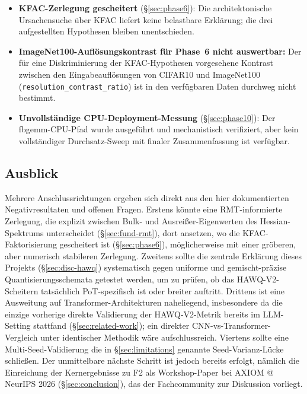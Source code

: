 \begin{itemize}
\item \textbf{KFAC-Zerlegung gescheitert} (\S\ref{sec:phase6}): Die architektonische Ursachensuche über KFAC liefert keine belastbare Erklärung; die drei aufgestellten Hypothesen bleiben unentschieden.
\item \textbf{ImageNet100-Auflösungskontrast für Phase~6 nicht auswertbar:} Der für eine Diskriminierung der KFAC-Hypothesen vorgesehene Kontrast zwischen den Eingabeauflösungen von CIFAR10 und ImageNet100 (\texttt{resolution\_contrast\_ratio}) ist in den verfügbaren Daten durchweg nicht bestimmt.
\item \textbf{Unvollständige CPU-Deployment-Messung} (\S\ref{sec:phase10}): Der fbgemm-CPU-Pfad wurde ausgeführt und mechanistisch verifiziert, aber kein vollständiger Durchsatz-Sweep mit finaler Zusammenfassung ist verfügbar.
\end{itemize}

\subsection{Ausblick}
\label{sec:outlook}

Mehrere Anschlussrichtungen ergeben sich direkt aus den hier dokumentierten Negativresultaten und offenen Fragen. Erstens könnte eine RMT-informierte Zerlegung, die explizit zwischen Bulk- und Ausreißer-Eigenwerten des Hessian-Spektrums unterscheidet (\S\ref{sec:fund-rmt}), dort ansetzen, wo die KFAC-Faktorisierung gescheitert ist (\S\ref{sec:phase6}), möglicherweise mit einer gröberen, aber numerisch stabileren Zerlegung. Zweitens sollte die zentrale Erklärung dieses Projekts (\S\ref{sec:disc-hawq}) systematisch gegen uniforme und gemischt-präzise Quantisierungsschemata getestet werden, um zu prüfen, ob das HAWQ-V2-Scheitern tatsächlich PoT-spezifisch ist oder breiter auftritt. Drittens ist eine Ausweitung auf Transformer-Architekturen naheliegend, insbesondere da die einzige vorherige direkte Validierung der HAWQ-V2-Metrik \citep{hill2026saturationmakesquantizationerror} bereits im LLM-Setting stattfand (\S\ref{sec:related-work}); ein direkter CNN-vs-Transformer-Vergleich unter identischer Methodik wäre aufschlussreich. Viertens sollte eine Multi-Seed-Validierung die in \S\ref{sec:limitations} genannte Seed-Varianz-Lücke schließen. Der unmittelbare nächste Schritt ist jedoch bereits erfolgt, nämlich die Einreichung der Kernergebnisse zu F2 als Workshop-Paper bei AXIOM @ NeurIPS 2026 (\S\ref{sec:conclusion}), das der Fachcommunity zur Diskussion vorliegt.